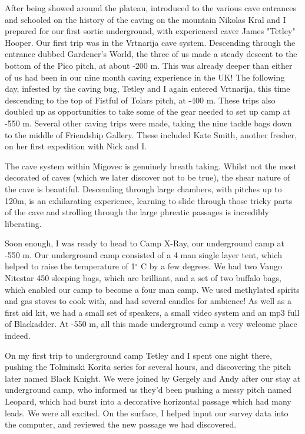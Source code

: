 After being showed around the plateau, introduced to the various cave entrances
and schooled on the history of the caving on the mountain Nikolas Kral and I
prepared for our first sortie underground, with experienced caver James
"Tetley" Hooper.  Our first trip was in the Vrtnarija cave
system.  Descending through the entrance dubbed Gardener's World,
the three of us made a steady descent to the bottom of the Pico pitch, at about
-200 m.  This was already deeper than either of us had been in our nine month
caving experience in the UK!  The following day, infested by the caving bug,
Tetley and I again entered Vrtnarija, this time descending to the top of
Fistful of Tolars pitch, at -400 m.  These trips also doubled up as
opportunities to take some of the gear needed to set up camp at -550 m.  Several
other caving trips were made, taking the nine tackle bags down to the middle of
Friendship Gallery.  These included Kate Smith, another fresher, on her first
expedition with Nick and I.

The cave system within Migovec is genuinely breath taking.  Whilst not the most
decorated of caves (which we later discover not to be true), the shear nature
of the cave is beautiful.  Descending through large chambers, with pitches up
to 120m, is an exhilarating experience, learning to slide through those tricky
parts of the cave and strolling through the large phreatic passages is
incredibly liberating.

Soon enough, I was ready to head to Camp X-Ray, our underground camp at -550 m.
Our underground camp consisted of a 4 man single layer tent, which helped to
raise the temperature of 1$^\circ$ C by a few degrees.  We had two Vango Nitestar 450 
sleeping bags, which are brilliant, and a set of two buffalo bags, which
enabled our camp to become a four man camp.  We used methylated spirits and gas
stoves to cook with, and had several candles for ambience!  As well as a first
aid kit, we had a small set of speakers, a small video system and an mp3 full
of Blackadder.  At -550 m, all this made underground camp a very welcome place
indeed.

On my first trip to underground camp Tetley and I spent one night there,
pushing the Tolminski Korita series for several hours, and discovering the
pitch later named Black Knight.  We were joined by Gergely and Andy 
after our stay at underground camp, who informed us they'd been pushing a messy
pitch named Leopard, which had burst into a decorative horizontal passage which
had many leads.  We were all excited.  On the surface, I helped input our
survey data into the computer, and reviewed the new passage we had discovered.  

